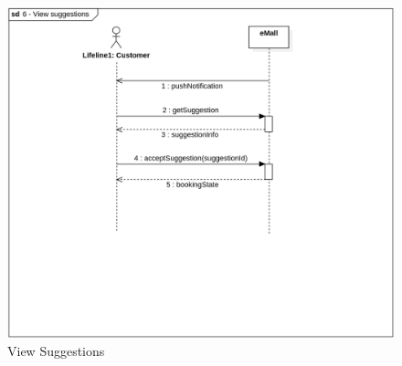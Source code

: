 \begin{figure}[H]
    \begin{center}
        \includegraphics[width=\textwidth]{img/sequence/suggest.png}
        \caption{View Suggestions}
    \end{center}
\end{figure}

